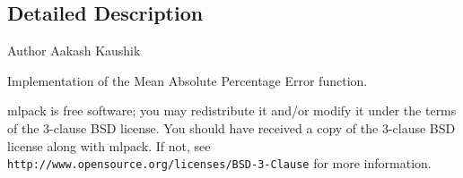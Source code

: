 \subsection{Detailed Description}
\begin{DoxyAuthor}{Author}
Aakash Kaushik
\end{DoxyAuthor}
Implementation of the Mean Absolute Percentage Error function.

mlpack is free software; you may redistribute it and/or modify it under the terms of the 3-\/clause B\+SD license. You should have received a copy of the 3-\/clause B\+SD license along with mlpack. If not, see {\tt http\+://www.\+opensource.\+org/licenses/\+B\+S\+D-\/3-\/\+Clause} for more information. 